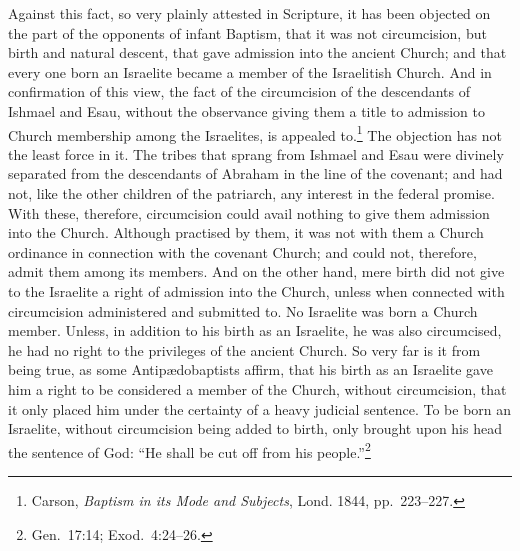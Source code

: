 \documentclass[
]{book}
\begin{document}
Against this fact, so very plainly attested in Scripture, it has been objected on the part of the opponents of infant Baptism, that it was not circumcision, but birth and natural descent, that gave admission into the ancient Church; and that every one born an Israelite became a member of the Israelitish Church. And in confirmation of this view, the fact of the circumcision of the descendants of Ishmael and Esau, without the observance giving them a title to admission to Church membership among the Israelites, is appealed to.\footnote{Carson, \emph{Baptism in its Mode and Subjects}, Lond. 1844, pp.~223--227.} The objection has not the least force in it. The tribes that sprang from Ishmael and Esau were divinely separated from the descendants of Abraham in the line of the covenant; and had not, like the other children of the patriarch, any interest in the federal promise. With these, therefore, circumcision could avail nothing to give them admission into the Church. Although practised by them, it was not with them a Church ordinance in connection with the covenant Church; and could not, therefore, admit them among its members. And on the other hand, mere birth did not give to the Israelite a right of admission into the Church, unless when connected with circumcision administered and submitted to. No Israelite was born a Church member. Unless, in addition to his birth as an Israelite, he was also circumcised, he had no right to the privileges of the ancient Church. So very far is it from being true, as some Antipædobaptists affirm, that his birth as an Israelite gave him a right to be considered a member of the Church, without circumcision, that it only placed him under the certainty of a heavy judicial sentence. To be born an Israelite, without circumcision being added to birth, only brought upon his head the sentence of God: ``He shall be cut off from his people.''\footnote{Gen.~17:14; Exod.~4:24--26.}
\end{document}

